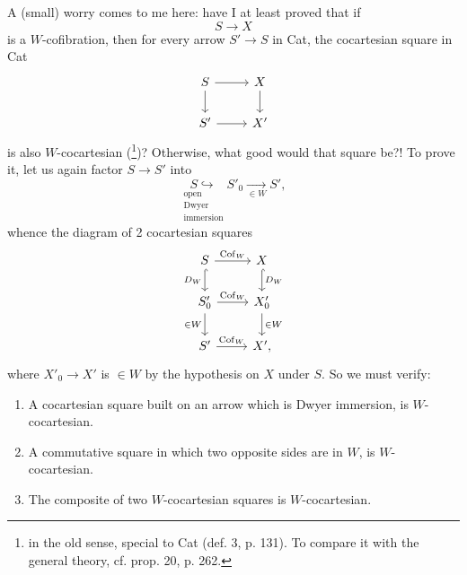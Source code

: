 A (small) worry comes to me here: have I at least proved that if
\[
S \longrightarrow X
\]
is a $W$-cofibration, then for every arrow $S' \longrightarrow S$ in Cat, the cocartesian square in Cat %
\[
\begin{tikzcd}
S \arrow[r] \arrow[d] & X \arrow[d] \\
S' \arrow[r] & X'
\end{tikzcd}
\]
is also $W$-cocartesian (\footnote[126]{in the old sense, special to Cat (def. 3, p. 131). To compare it with the general theory, cf. prop. 20, p. 262.})? Otherwise,
what good would that square be?! To prove it, let us again factor $S \longrightarrow S'$ into
\[
\underset{\substack{\text{open}\\ \text{Dwyer}\\ \text{immersion}}}{S \hookrightarrow} S'_0 \underset{\in W}{\longrightarrow} S',
\]
whence the diagram of 2 cocartesian squares
\[
\begin{tikzcd}
S \arrow[r, "\mathrm{Cof}_W"] \arrow[d, hook, "D_W"'] & X \arrow[d, hook, "D_W"] \\
S'_0 \arrow[r, "\mathrm{Cof}_W"] \arrow[d, "\in W"'] & X'_0 \arrow[d, "\in W"] \\
S' \arrow[r, "\mathrm{Cof}_W"] & X',
\end{tikzcd}
\]
where $X'_0 \longrightarrow X'$ is $\in W$ by the hypothesis on $X$ under $S$. So we must verify:
\begin{enumerate}
\item[a)] A cocartesian square built on an arrow which is Dwyer immersion, is $W$-cocartesian.
\item[b)] A commutative square in which two opposite sides are in $W$, is $W$-cocartesian.
\item[c)] The composite of two $W$-cocartesian squares is $W$-cocartesian.
\end{enumerate}

